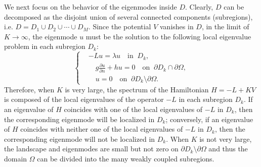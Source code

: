 \documentclass[a4paper,11pt]{article}
\begin{document}
We next focus on the behavior of the eigenmodes inside $D$. Clearly, $D$ can be decomposed as the disjoint union of several connected components (subregions), i.e. $D = D_1 \cup D_2 \cup \cdots \cup D_M$. Since the potential $V$ vanishes in $D$, in the limit of $K\rightarrow\infty$, the eigenmode $u$ must be the solution to the following local eigenvalue problem in each subregion $D_k$:
\begin{equation}\label{subregion}
\left\{
\begin{split}
& - L u = \lambda u \quad \textrm{in}\;\;D_k, \\
& \quad g \frac{\partial u}{\partial n} + h u = 0 \quad \textrm{on}\;\;\partial D_k \cap \partial \Omega, \\
& \quad u = 0 \quad \textrm{on}\;\;\partial D_k \setminus \partial \Omega.
\end{split}
\right.
\end{equation}
Therefore, when $K$ is very large, the spectrum of the Hamiltonian $H = - L + K V$ is composed of the local eigenvalues of the operator $-L$ in each subregion $D_k$. If an eigenvalue of $H$ coincides with one of the local eigenvalues of $-L$ in $D_k$, then the corresponding eigenmode will be localized in $D_k$; conversely, if an eigenvalue of $H$ coincides with neither one of the local eigenvalues of $-L$ in $D_k$, then the corresponding eigenmode will not be localized in $D_k$. When $K$ is not very large, the landscape and eigenmodes are small but not zero on $\partial D_k \setminus \partial \Omega$ and thus the domain $\Omega$ can be divided into the many weakly coupled subregions.
\end{document}
